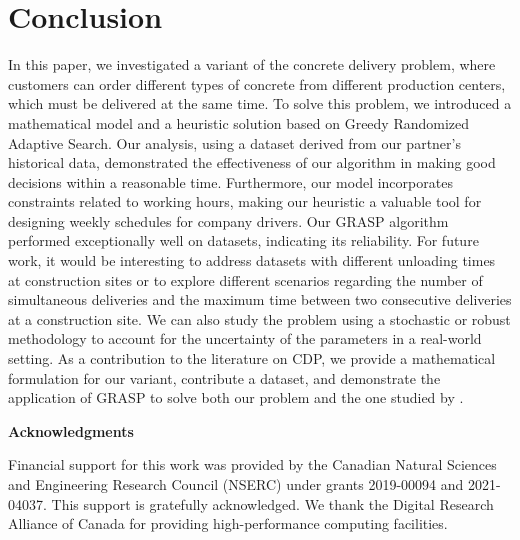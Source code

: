 \section{Conclusion}
\label{sec:cdp_concl}

In this paper, we investigated a variant of the concrete delivery problem, where customers can order different types of concrete from different production centers, which must be delivered at the same time. To solve this problem, we introduced a mathematical model and a heuristic solution based on Greedy Randomized Adaptive Search. Our analysis, using a dataset derived from our partner's historical data, demonstrated the effectiveness of our algorithm in making good decisions within a reasonable time. Furthermore, our model incorporates constraints related to working hours, making our heuristic a valuable tool for designing weekly schedules for company drivers. Our GRASP algorithm performed exceptionally well on \cite{kinable2014concrete} datasets, indicating its reliability. For future work, it would be interesting to address datasets with different unloading times at construction sites or to explore different scenarios regarding the number of simultaneous deliveries and the maximum time between two consecutive deliveries at a construction site. We can also study the problem using a stochastic or robust methodology to account for the uncertainty of the parameters in a real-world setting. As a contribution to the literature on CDP, we provide a mathematical formulation for our variant, contribute a dataset, and demonstrate the application of GRASP to solve both our problem and the one studied by \cite{kinable2014concrete}.
\vspace{0.1in}

\vspace{1.5cm} \noindent \textbf{Acknowledgments}

Financial support for this work was provided by the Canadian Natural Sciences and Engineering Research Council (NSERC) under grants 2019-00094 and 2021-04037. This support is gratefully acknowledged. We thank the Digital Research Alliance of Canada for providing high-performance computing facilities.



